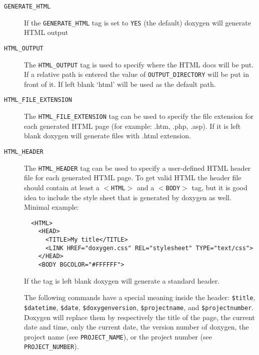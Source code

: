  \begin{description}
\item[{\tt GENERATE\_\-HTML} ] If the {\tt GENERATE\_\-HTML} tag is set to {\tt YES} (the default) doxygen will generate HTML output

\label{config_cfg_html_output}
\hypertarget{config_cfg_html_output}{}
 \item[{\tt HTML\_\-OUTPUT} ] The {\tt HTML\_\-OUTPUT} tag is used to specify where the HTML docs will be put. If a relative path is entered the value of {\tt OUTPUT\_\-DIRECTORY} will be put in front of it. If left blank `html' will be used as the default path.

\label{config_cfg_html_file_extension}
\hypertarget{config_cfg_html_file_extension}{}
 \item[{\tt HTML\_\-FILE\_\-EXTENSION} ] The {\tt HTML\_\-FILE\_\-EXTENSION} tag can be used to specify the file extension for each generated HTML page (for example: .htm, .php, .asp). If it is left blank doxygen will generate files with .html extension.

\label{config_cfg_html_header}
\hypertarget{config_cfg_html_header}{}
 \item[{\tt HTML\_\-HEADER} ] The {\tt HTML\_\-HEADER} tag can be used to specify a user-defined HTML header file for each generated HTML page. To get valid HTML the header file should contain at least a {\tt $<$HTML$>$} and a {\tt $<$BODY$>$} tag, but it is good idea to include the style sheet that is generated by doxygen as well. Minimal example: 

\footnotesize\begin{verbatim}
  <HTML>
    <HEAD>
      <TITLE>My title</TITLE>
      <LINK HREF="doxygen.css" REL="stylesheet" TYPE="text/css">
    </HEAD>
    <BODY BGCOLOR="#FFFFFF">
\end{verbatim}
\normalsize
 If the tag is left blank doxygen will generate a standard header.

The following commands have a special meaning inside the header: {\tt \$title}, {\tt \$datetime}, {\tt \$date}, {\tt \$doxygenversion}, {\tt \$projectname}, and {\tt \$projectnumber}. Doxygen will replace them by respectively the title of the page, the current date and time, only the current date, the version number of doxygen, the project name (see {\tt PROJECT\_\-NAME}), or the project number (see {\tt PROJECT\_\-NUMBER}).


\end{description}
